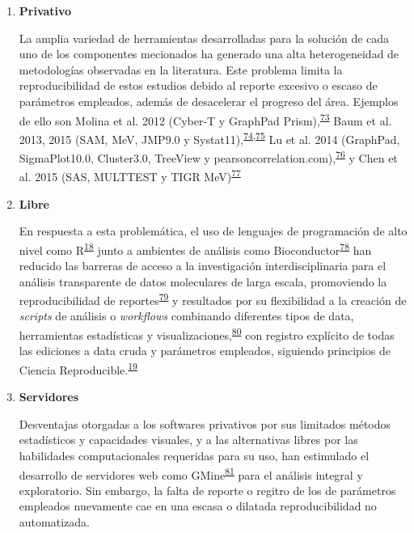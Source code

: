 \documentclass[]{article}
\begin{document}
\begin{enumerate}
\begin{enumerate}
    \begin{enumerate}
    \def\labelenumiii{\arabic{enumiii}.}
    \item
      \textbf{Privativo}

      La amplia variedad de herramientas desarrolladas para la solución
      de cada uno de los componentes mecionados ha generado una alta
      heterogeneidad de metodologías observadas en la literatura. Este
      problema limita la reproducibilidad de estos estudios debido al
      reporte excesivo o escaso de parámetros empleados, además de
      desacelerar el progreso del área. Ejemplos de ello son Molina et
      al. 2012 (Cyber-T y GraphPad
      Prism),\textsuperscript{\protect\hyperlink{ref-molina2012}{73}}
      Baum et al. 2013, 2015 (SAM, MeV, JMP9.0 y
      Systat11),\textsuperscript{\protect\hyperlink{ref-baum2013}{74},\protect\hyperlink{ref-baum2015}{75}}
      Lu et al. 2014 (GraphPad, SigmaPlot10.0, Cluster3.0, TreeView y
      pearsoncorrelation.com),\textsuperscript{\protect\hyperlink{ref-lu2014rama}{76}}
      y Chen et al. 2015 (SAS, MULTTEST y TIGR
      MeV)\textsuperscript{\protect\hyperlink{ref-chen2015immunomics}{77}}
    \item
      \textbf{Libre}

      En respuesta a esta problemática, el uso de lenguajes de
      programación de alto nivel como
      R\textsuperscript{\protect\hyperlink{ref-R}{18}} junto a ambientes
      de análisis como
      Bioconductor\textsuperscript{\protect\hyperlink{ref-bioconductor2004}{78}}
      han reducido las barreras de acceso a la investigación
      interdisciplinaria para el análisis transparente de datos
      moleculares de larga escala, promoviendo la reproducibilidad de
      reportes\textsuperscript{\protect\hyperlink{ref-knitr}{79}} y
      resultados por su flexibilidad a la creación de \emph{scripts} de
      análisis o \emph{workflows} combinando diferentes tipos de data,
      herramientas estadísticas y
      visualizaciones,\textsuperscript{\protect\hyperlink{ref-Biobase}{80}}
      con registro explícito de todas las ediciones a data cruda y
      parámetros empleados, siguiendo principios de Ciencia
      Reproducible.\textsuperscript{\protect\hyperlink{ref-CienciaReproducible2016}{19}}
      \newpage
    \item
      \textbf{Servidores}

      Desventajas otorgadas a los softwares privativos por sus limitados
      métodos estadísticos y capacidades visuales, y a las alternativas
      libres por las habilidades computacionales requeridas para su uso,
      han estimulado el desarrollo de servidores web como
      GMine\textsuperscript{\protect\hyperlink{ref-gmine2016}{81}} para
      el análisis integral y exploratorio. Sin embargo, la falta de
      reporte o regitro de los de parámetros empleados nuevamente cae en
      una escasa o dilatada reproducibilidad no automatizada.
    \end{enumerate}
  \end{enumerate}
\end{enumerate}
\end{document}
